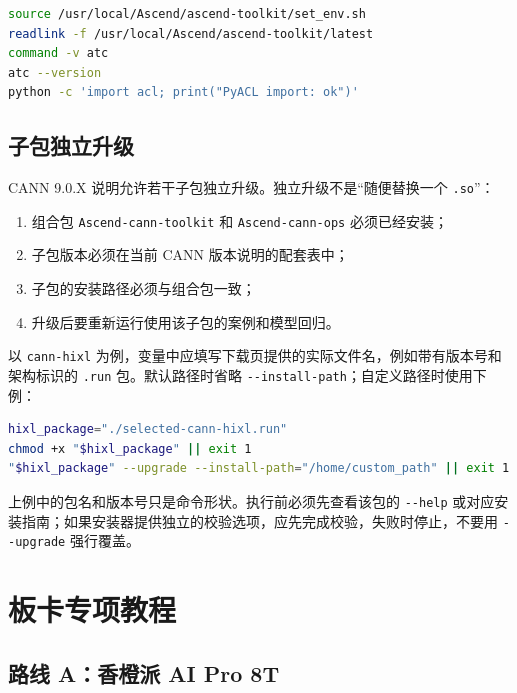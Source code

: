 \begin{lstlisting}[language=bash]
source /usr/local/Ascend/ascend-toolkit/set_env.sh
readlink -f /usr/local/Ascend/ascend-toolkit/latest
command -v atc
atc --version
python -c 'import acl; print("PyACL import: ok")'
\end{lstlisting}

\subsection{子包独立升级}\label{ux5b50ux5305ux72ecux7acbux5347ux7ea7}

CANN 9.0.X 说明允许若干子包独立升级。独立升级不是``随便替换一个
\passthrough{\lstinline!.so!}''：

\begin{enumerate}
\def\labelenumi{\arabic{enumi}.}
\tightlist
\item
  组合包 \passthrough{\lstinline!Ascend-cann-toolkit!} 和
  \passthrough{\lstinline!Ascend-cann-ops!} 必须已经安装；
\item
  子包版本必须在当前 CANN 版本说明的配套表中；
\item
  子包的安装路径必须与组合包一致；
\item
  升级后要重新运行使用该子包的案例和模型回归。
\end{enumerate}

以 \passthrough{\lstinline!cann-hixl!}
为例，变量中应填写下载页提供的实际文件名，例如带有版本号和架构标识的
\passthrough{\lstinline!.run!} 包。默认路径时省略
\passthrough{\lstinline!--install-path!}；自定义路径时使用下例：

\begin{lstlisting}[language=bash]
hixl_package="./selected-cann-hixl.run"
chmod +x "$hixl_package" || exit 1
"$hixl_package" --upgrade --install-path="/home/custom_path" || exit 1
\end{lstlisting}

上例中的包名和版本号只是命令形状。执行前必须先查看该包的
\passthrough{\lstinline!--help!}
或对应安装指南；如果安装器提供独立的校验选项，应先完成校验，失败时停止，不要用
\passthrough{\lstinline!--upgrade!} 强行覆盖。

\section{板卡专项教程}\label{ux677fux5361ux4e13ux9879ux6559ux7a0b}

\subsection{路线 A：香橙派 AI Pro
8T}\label{ux8defux7ebf-aux9999ux6a59ux6d3e-ai-pro-8t}

